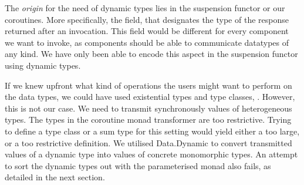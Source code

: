 The \emph{origin} for the need of dynamic types lies in the suspension functor or our coroutines.
More specifically, the  field, that designates the type of the response returned after an invocation.
This field would be different for every component we want to invoke, as components should be able to communicate datatypes of any kind.
We have only been able to encode this aspect in the suspension functor using dynamic types.




If we knew upfront what kind of operations the users might want to perform on the data types, we could have used existential types and type classes, \viz \cite{Laufer:1994:PTI:186025.186031,Kiselyov:2004:STH:1017472.1017488}.
However, this is not our case.
We need to transmit synchronously values of heterogeneous types.
The types in the coroutine monad transformer are too restrictive.
Trying to define a type class or a sum type for this setting would yield either a too large, or a too restrictive definition.
%
We utilised \textsf{Data.Dynamic} to convert transmitted values of a dynamic type into values of concrete monomorphic types.
An attempt to sort the dynamic types out with the parameterised monad also fails, as detailed in the next section.

